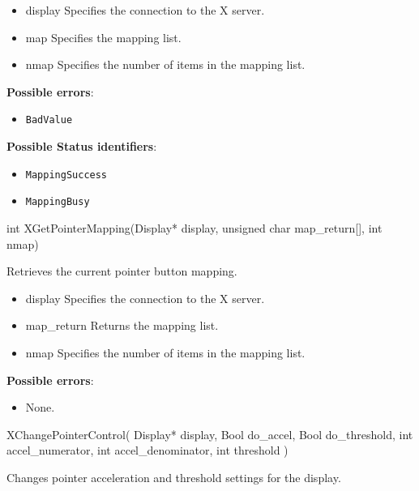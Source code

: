 \documentclass{report}
\begin{document}
\begin{itemize}
        \begin{itemize}
            \item display Specifies the connection to the X server.
            \item map Specifies the mapping list.
            \item nmap Specifies the number of items in the mapping list.
        \end{itemize}

        \textbf{Possible errors}:
        \begin{itemize}
            \item \texttt{BadValue}
        \end{itemize}

        \textbf{Possible Status identifiers}:
        \begin{itemize}
            \item \texttt{MappingSuccess}
            \item \texttt{MappingBusy}
        \end{itemize}

        \begin{cppcode}
            int XGetPointerMapping(Display* display, unsigned char map_return[], int nmap)
        \end{cppcode}
        \bigbreak \noindent
        Retrieves the current pointer button mapping.

        \begin{itemize}
            \item display Specifies the connection to the X server.
            \item map\_return Returns the mapping list.
            \item nmap Specifies the number of items in the mapping list.
        \end{itemize}

        \textbf{Possible errors}:
        \begin{itemize}
            \item None.
        \end{itemize}

        \begin{cppcode}
        XChangePointerControl(
            Display* display,
            Bool do_accel,
            Bool do_threshold,
            int accel_numerator,
            int accel_denominator,
            int threshold
        )
        \end{cppcode}
        \bigbreak \noindent
        Changes pointer acceleration and threshold settings for the display.


\end{itemize}
\end{document}
